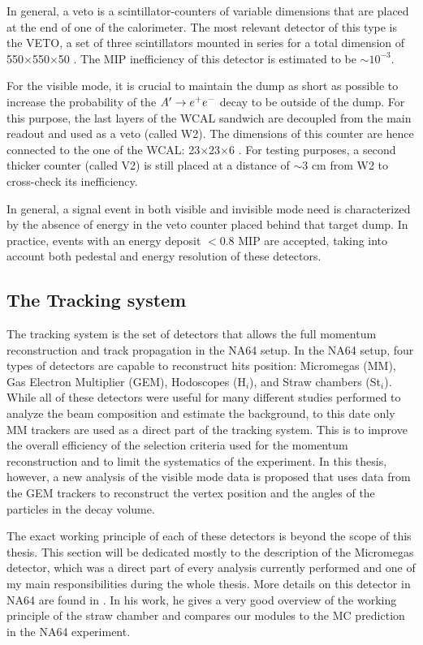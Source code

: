 In general, a veto is a scintillator-counters of variable dimensions that are placed at the end of one of the calorimeter. The most relevant detector of this type is the VETO, a set of three scintillators mounted in series for a total dimension of 550$\times$550$\times$50 \mmc. The MIP inefficiency of this detector is estimated to be $\sim 10^{-3}$.

For the visible mode, it is crucial to maintain the dump as short as possible to increase the probability of the $A' \to e^+e^-$ decay to be outside of the dump. For this purpose, the last layers of the WCAL sandwich are decoupled from the main readout and used as a veto (called W2). The dimensions of this counter are hence connected to the one of the WCAL: 23$\times$23$\times$6 \mmc. For testing purposes, a second thicker counter (called V2) is still placed at a distance of $\sim3$ \si{cm} from W2 to cross-check its inefficiency.

In general, a signal event in both visible and invisible mode need is characterized by the absence of energy in the veto counter placed behind that target dump. In practice, events with an energy deposit $<$0.8 MIP are accepted, taking into account both pedestal and energy resolution of these detectors.

\subsection{The Tracking system}
\label{ch2:sec:detectors-tracking}

The tracking system is the set of detectors that allows the full momentum reconstruction and track propagation in the NA64 setup. In the NA64 setup, four types of detectors are capable to reconstruct hits position: Micromegas (MM), Gas Electron Multiplier (GEM), Hodoscopes (H$_i$), and Straw chambers (St$_i$). While all of these detectors were useful for many different studies performed to analyze the beam composition and estimate the background, to this date only MM trackers are used as a direct part of the tracking system. This is to improve the overall efficiency of the selection criteria used for the momentum reconstruction and to limit the systematics of the experiment. In this thesis, however, a new analysis of the visible mode data is proposed that uses data from the GEM trackers to reconstruct the vertex position and the angles of the particles in the decay volume.

The exact working principle of each of these detectors is beyond the scope of this thesis. This section will be dedicated mostly to the description of the Micromegas detector, which was a direct part of every analysis currently performed and one of my main responsibilities during the whole thesis. More details on this detector in NA64 are found in \cite{pdegen-thesis}. In his work, he gives a very good overview of the working principle of the straw chamber and compares our modules to the MC prediction in the NA64 experiment.

